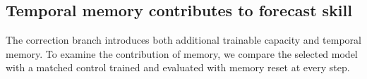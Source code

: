 \documentclass{article}
\newcommand{\vfourchange}[1]{{\color{blue}#1}}
\newcommand{\vfourred}[1]{{\color{red}#1}}
\newif\ifvfivechanges
\newcommand{\vfiveidentity}[1]{#1}
\DeclareRobustCommand{\vfiveadded}[1]{\ifvfivechanges{\color{vfiveAdded}%
  \let\vfourchange\vfiveidentity\let\vfourred\vfiveidentity#1}\else{\color{blue}%
  \let\vfourchange\vfiveidentity\let\vfourred\vfiveidentity#1}\fi}
\begin{document}
\subsection{Temporal memory contributes \vfourchange{to forecast skill}}
\label{sec:memory_ablation}
\ifvfivechanges
\par\begingroup\color{vfiveDeleted}\noindent
\sout{The preceding results show that GraphCast--Mamba improves forecasts at longer lead times across the predicted atmospheric state. The correction branch introduces both additional trainable capacity and temporal memory. To examine the contribution of temporal memory in the Mamba correction branch, we compare the selected model with a matched control trained and evaluated with memory reset at every step.}
\par\endgroup
\fi
\vfiveadded{The correction branch introduces both additional trainable capacity and temporal memory. To \vfourchange{examine} the contribution of memory, we \vfourchange{compare the selected model with a matched control trained and evaluated with memory reset at every step.}}
\end{document}
